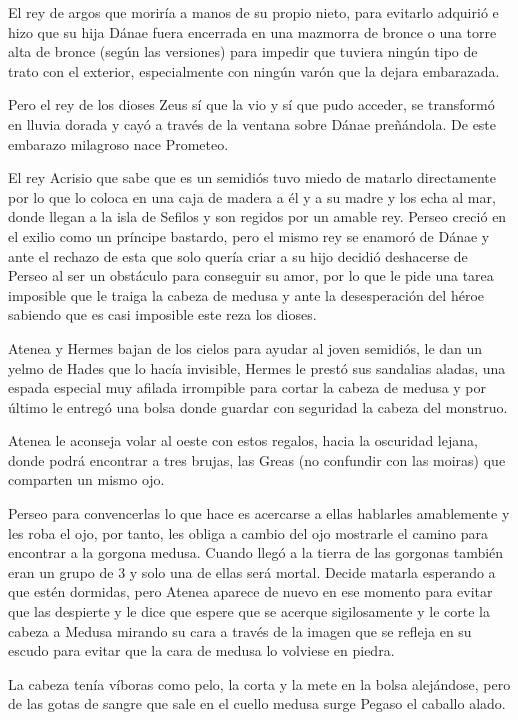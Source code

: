El rey de argos que moriría a manos de su propio nieto, para evitarlo adquirió e hizo que su hija Dánae fuera encerrada en una mazmorra de bronce o una torre alta de bronce (según las versiones) para impedir que tuviera ningún tipo de trato con el exterior, especialmente con ningún varón que la dejara embarazada. 

Pero el rey de los dioses Zeus sí que la vio y sí que pudo acceder, se transformó en lluvia dorada y cayó a través de la ventana sobre Dánae preñándola. De este embarazo milagroso nace Prometeo. 

El rey Acrisio que sabe que es un semidiós tuvo miedo de matarlo directamente por lo que lo coloca en una caja de madera a él y a su madre y los echa al mar, donde llegan a la isla de Sefilos y son regidos por un amable rey. Perseo creció en el exilio como un príncipe bastardo, pero el mismo rey se enamoró de Dánae y ante el rechazo de esta que solo quería criar a su hijo decidió deshacerse de Perseo al ser un obstáculo para conseguir su amor, por lo que le pide una tarea imposible que le traiga la cabeza de medusa y ante la desesperación del héroe sabiendo que es casi imposible este reza los dioses. 

Atenea y Hermes bajan de los cielos para ayudar al joven semidiós, le dan un yelmo de Hades que lo hacía invisible, Hermes le prestó sus sandalias aladas, una espada especial muy afilada irrompible para cortar la cabeza de medusa y por último le entregó una bolsa donde guardar con seguridad la cabeza del monstruo.

Atenea le aconseja volar al oeste con estos regalos, hacia la oscuridad lejana, donde podrá encontrar a tres brujas, las Greas (no confundir con las moiras) que comparten un mismo ojo.

Perseo para convencerlas lo que hace es acercarse a ellas hablarles amablemente y les roba el ojo, por tanto, les obliga a cambio del ojo mostrarle el camino para encontrar a la gorgona medusa. Cuando llegó a la tierra de las gorgonas también eran un grupo de 3 y solo una de ellas será mortal. Decide matarla esperando a que estén dormidas, pero Atenea aparece de nuevo en ese momento para evitar que las despierte y le dice que espere que se acerque sigilosamente y le corte la cabeza a Medusa mirando su cara a través de la imagen que se refleja en su escudo para evitar que la cara de medusa lo volviese en piedra.

La cabeza tenía víboras como pelo, la corta y la mete en la bolsa alejándose, pero de las gotas de sangre que sale en el cuello medusa surge Pegaso el caballo alado.

